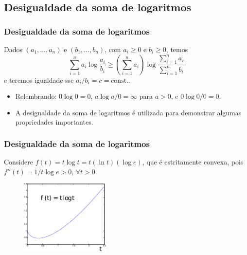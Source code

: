 \subsection{Desigualdade da soma de logaritmos}
\begin{frame}%
  \frametitle{Desigualdade da soma de logaritmos}
  \begin{theorem}
  Dados $(a_1, \ldots, a_n)$ e $(b_1,\ldots,b_n)$, com $a_i \geq 0$ e $b_i \geq 0$, temos
        \begin{equation}
         \sum_{i=1}^n a_i \log \frac{a_i}{b_i} \geq \left( \sum_{i=1}^n a_i \right) \log \frac{\sum_{i=1}^n a_i}{\sum_{i=1}^n b_i}
        \end{equation}
  e teremos igualdade sse $a_i/b_i = c = \text{const.}$.
  \end{theorem}

  \begin{itemize}
  \item Relembrando: $0 \log 0 = 0$, $a \log a/0 = \infty$ para $a>0$, e $0 \log 0/0 =0$.
  \item A desigualdade da soma de logaritmos é utilizada para demonstrar algumas propriedades importantes.
  \end{itemize}
\end{frame}

\begin{frame}%
  \frametitle{Desigualdade da soma de logaritmos}

  Considere $f(t) = t \log t = t (\ln t) (\log e)$, que é estritamente convexa, pois
  $f''(t) = 1/t \log e >0$, $\forall t > 0$.
  
  \begin{figure}[h!]
  \centering
  \includegraphics[width=0.4\textwidth]{images/tlogt.pdf}
  \label{fig:tlogt}
  \end{figure}
\end{frame}

